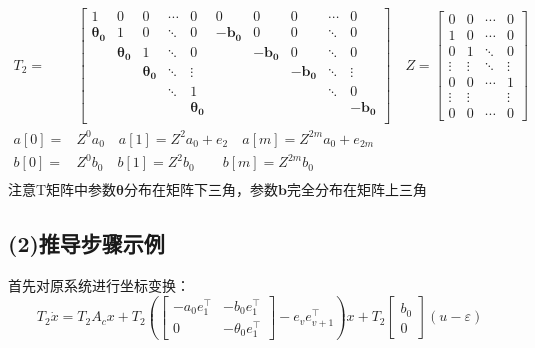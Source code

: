 \documentclass[a4paper,12pt]{article}
\begin{document}
\begin{align*}
    T_2 = & 
    \left[
        \begin{array}{ccccc|ccccc}
            1 & 0 & 0 & \cdots & 0 & 0 & 0 & 0 & \cdots & 0 \\
            \mathbf{\theta_0} & 1 & 0 & \ddots & 0 & -\mathbf{b_0} & 0 & 0 & \ddots & 0\\
            & \mathbf{\theta_0} & 1 & \ddots & 0 &  & -\mathbf{b_0} & 0 & \ddots & 0 \\ 
            &  & \mathbf{\theta_0} & \ddots & \vdots &  &  & -\mathbf{b_0} & \ddots & \vdots \\
            &  &  & \ddots & 1 &  &  &  & \ddots & 0 \\
            &  &  &  & \mathbf{\theta_0} &  &  &  &  & -\mathbf{b_0}\\
        \end{array}
    \right]
    \quad
    Z = \begin{bmatrix}
        0 & 0 & \cdots & 0 \\
        1 & 0 & \cdots & 0 \\
        0 & 1 & \ddots & 0 \\
        \vdots & \vdots & \ddots & \vdots \\
        0 & 0 & \cdots & 1 \\
        \vdots & \vdots &  & \vdots \\
        0 & 0 & \cdots & 0
    \end{bmatrix}\\
    a[0] =& Z^0 a_0 \quad a[1] = Z^2 a_0 + e_2 \quad a[m] = Z^{2m} a_0 + e_{2m}\\
    b[0] =& Z^0 b_0 \quad b[1] = Z^2 b_0 \qquad b[m] = Z^{2m} b_0\\
\end{align*}
注意T矩阵中参数$\boldsymbol{\theta}$分布在矩阵下三角，参数$\boldsymbol{b}$完全分布在矩阵上三角

\subsection*{(2)推导步骤示例}
首先对原系统进行坐标变换：
\[
    T_2\dot{x} =    
    T_2 A_c x + 
    T_2 \left(
        \left[
        \begin{array}{c|c}
        -a_0e_1^\top & -b_0e_1^\top\\ \hline
        0 & -\theta_0e_1^\top 
        \end{array}
        \right]
        - e_ve_{v+1}^\top
    \right)
     x + 
    T_2 \begin{bmatrix}
        b_0 \\ 0
    \end{bmatrix} (u-\varepsilon)
\]
\end{document}

